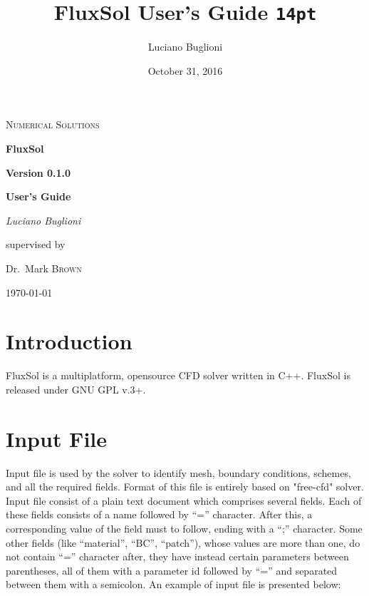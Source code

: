 \documentclass{article}     %
\title{FluxSol User's Guide \texttt{14pt}}
\date{October 31, 2016}
\author{Luciano Buglioni}
\begin{document}

\begin{titlepage}
	\centering
	{\scshape\LARGE Numerical Solutions\par}
	\vspace{1.5cm}
	{\Huge\bfseries FluxSol \par}
	\vspace{0.5cm}
	{\huge\bfseries Version 0.1.0\par}
	\vspace{2cm}	
	{\Large\bfseries User's Guide\par}
	\vspace{3cm}
	{\Large\itshape Luciano Buglioni\par}
	\vfill
	supervised by\par
	Dr.~Mark \textsc{Brown}

	\vfill

	{\large \today\par}
\end{titlepage}

\pagebreak


\tableofcontents
\pagebreak

\pagebreak
\section{Introduction}

FluxSol is a multiplatform, opensource CFD solver written in C++.
FluxSol is released under GNU GPL v.3+.
\section{Input File}

Input file is used by the solver to identify mesh, boundary conditions, schemes, and all the required fields. Format of this file is entirely based on "free-cfd" solver. Input file consist of a plain text document which comprises several fields. Each of these fields consists of a name followed by  “=” character. After this, a corresponding value of the field must to follow, ending with a “;” character. Some other fields (like “material”, “BC”, “patch”), whose values are more than one, do not contain “=” character after, they have instead certain parameters between parentheses, all of them with a parameter id followed by “=” and separated between them with a semicolon. An example of input file is presented below: \\
\end{document}
